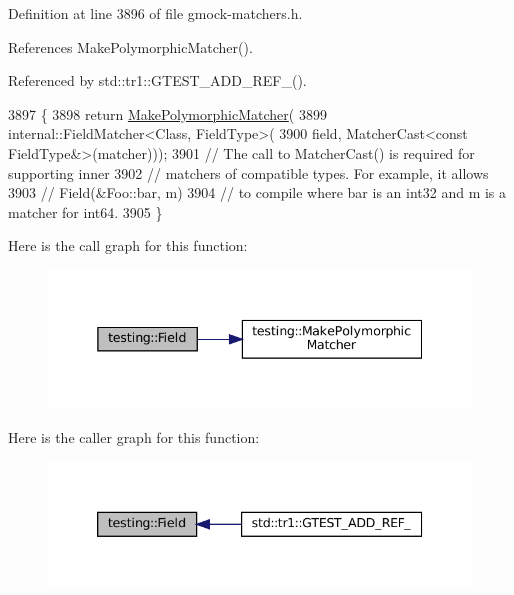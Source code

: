 Definition at line 3896 of file gmock-\/matchers.\+h.



References Make\+Polymorphic\+Matcher().



Referenced by std\+::tr1\+::\+G\+T\+E\+S\+T\+\_\+\+A\+D\+D\+\_\+\+R\+E\+F\+\_\+().


\begin{DoxyCode}
3897                                                         \{
3898   \textcolor{keywordflow}{return} \hyperlink{namespacetesting_a667ca94f190ec2e17ee2fbfdb7d3da04}{MakePolymorphicMatcher}(
3899       internal::FieldMatcher<Class, FieldType>(
3900           field, MatcherCast<const FieldType&>(matcher)));
3901   \textcolor{comment}{// The call to MatcherCast() is required for supporting inner}
3902   \textcolor{comment}{// matchers of compatible types.  For example, it allows}
3903   \textcolor{comment}{//   Field(&Foo::bar, m)}
3904   \textcolor{comment}{// to compile where bar is an int32 and m is a matcher for int64.}
3905 \}
\end{DoxyCode}
Here is the call graph for this function\+:
\nopagebreak
\begin{figure}[H]
\begin{center}
\leavevmode
\includegraphics[width=338pt]{namespacetesting_a4df3849391696aa93ac3a7703a717c2a_cgraph}
\end{center}
\end{figure}
Here is the caller graph for this function\+:
\nopagebreak
\begin{figure}[H]
\begin{center}
\leavevmode
\includegraphics[width=339pt]{namespacetesting_a4df3849391696aa93ac3a7703a717c2a_icgraph}
\end{center}
\end{figure}
\mbox{\label{namespacetesting_ac75507edb7998957b48fb17a9b8a020b}} 
